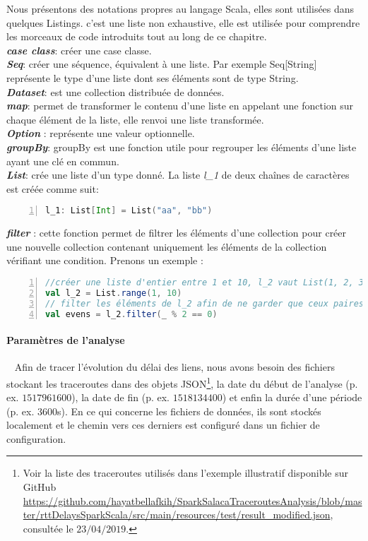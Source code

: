 Nous présentons  des notations   propres au langage Scala, elles sont utilisées dans quelques Listings. c'est une liste non exhaustive, elle est utilisée pour comprendre les morceaux de code introduits tout au long de ce chapitre.\\
\textbf{\textit{case class}}: créer une case classe.\\
\textit{\textbf{Seq}}: créer une séquence, équivalent à une liste. Par exemple Seq[String] représente le type d'une liste dont ses éléments sont de type String.  \\
\textbf{\textit{Dataset}}:  est une collection distribuée de données. \\
\textit{\textbf{map}}: permet de transformer le contenu d'une liste en appelant une fonction sur chaque élément de la liste, elle renvoi une liste transformée. \\
\textit{\textbf{Option}} : représente une valeur optionnelle.  \\
\textit{\textbf{groupBy}}: groupBy est une fonction utile pour regrouper les éléments d'une liste ayant une clé en commun.
\\
\textbf{\textit{List}}: crée une liste d'un type donné. La liste \textit{l\_1} de deux chaînes de caractères est créée comme suit:
\begin{lstlisting}[language=scala,firstnumber=1,label={lst:case-class-hop}, basicstyle = \footnotesize,escapechar=|,numbers=left,
stepnumber=1]
l_1: List[Int] = List("aa", "bb")
\end{lstlisting} 
\noindent \textbf{\textit{filter}} : cette fonction permet de filtrer les éléments d'une collection pour créer une nouvelle collection contenant uniquement les éléments de la collection   vérifiant une condition. Prenons un  exemple : 
\begin{lstlisting}[language=scala,firstnumber=1, basicstyle = \footnotesize,escapechar=|,numbers=left,
stepnumber=1]
//créer une liste d'entier entre 1 et 10, l_2 vaut List(1, 2, 3, 4, 5, 6, 7, 8, 9)
val l_2 = List.range(1, 10)   
// filter les éléments de l_2 afin de ne garder que ceux paires, evens vaut List(2, 4, 6, 8)
val evens = l_2.filter(_ % 2 == 0)  
\end{lstlisting}


\paragraph{Paramètres de l'analyse}~
Afin de tracer l'évolution du délai des liens, nous avons besoin des fichiers stockant les  traceroutes  dans  des objets JSON\footnote{Voir la liste des traceroutes utilisés dans l'exemple illustratif disponible sur GitHub \url{https://github.com/hayatbellafkih/SparkSalacaTraceroutesAnalysis/blob/master/rttDelaysSparkScala/src/main/resources/test/result_modified.json}, consultée le $23/04/2019$.}, la date du début de l'analyse (p. ex. $ 1517961600 $), la date de fin (p. ex. $ 1518134400 $) et enfin la durée d'une période (p. ex. $3600$s). En ce qui concerne les fichiers de données, ils sont stockés localement et le chemin vers ces derniers est configuré dans un fichier de configuration.

